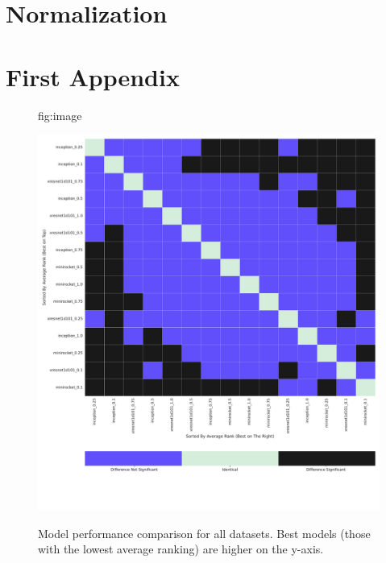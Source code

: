 \documentclass[pmlr,twocolumn]{jmlr}%
\begin{document}

\section{Normalization}
\label{sec:Norm}




\appendix
\section{First Appendix}\label{apd:model_vs_model}
\begin{figure}[tbp]
\floatconts
  {fig:image}
  {\caption{Model performance comparison for all datasets. Best models (those with the lowest average ranking) are higher on the y-axis.}}
  {\includegraphics[width=1\linewidth]{images/model_comparisons_alldatasets.pdf}}
 
\end{figure}
\end{document}
